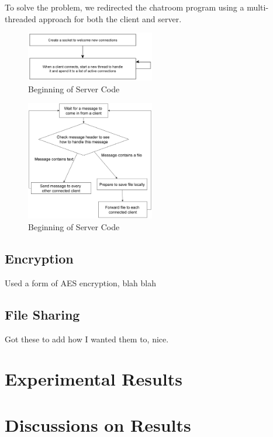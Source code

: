 \documentclass{article}
\begin{document}
To solve the problem, we redirected the chatroom program using a multi-threaded approach for both the client and server.

\begin{figure}[h]
\caption{Beginning of Server Code}
\centering
\includegraphics[width=0.5\textwidth]{media/serverFlowchart2.png}
\end{figure}

\begin{figure}[h]
\caption{Beginning of Server Code}
\centering
\includegraphics[width=0.5\textwidth]{media/serverFlowchart1.png}
\end{figure}

\subsection{Encryption}

Used a form of AES encryption, blah blah

\subsection{File Sharing}

Got these to add how I wanted them to, nice. 

\section{Experimental Results}

\section{Discussions on Results}
\end{document}
